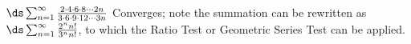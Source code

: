 {$\ds\sum_{n=1}^\infty \frac{2\cdot4\cdot6\cdot8\cdots 2n}{3\cdot6\cdot9\cdot12\cdots 3n}$
}
{Converges; note the summation can be rewritten as $\ds\sum_{n=1}^\infty \frac{2^nn!}{3^nn!}$, to which the Ratio Test or Geometric Series Test can be applied.
}